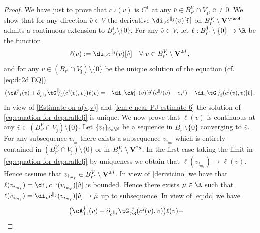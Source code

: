 \documentclass[11pt,a4paper,reqno]{article}
\numberwithin{equation}{section}
\theoremstyle{definition}
\begin{document}
\begin{proof}
We have  just to prove that 
$ c^{\parallel_{\hat \jmath}}(v) $ 
is $ C^1 $
at any  $ \bar v \in B_{r'}^V\cap V_{\hat \jmath}  $, $ \bar v \neq 0 $.
    We show that for any direction $\hat v\in V$ the derivative $\di_v c^{\parallel_{\hat \jmath}}(v)[\hat v]$ on $B_{r'}^V\setminus {\bf V}^{\twod}$ admits a continuous extension to $B_{r'}^{\hat \jmath}\setminus\{0\}$.
    For any $\hat v\in V$, let $\ell:B_{r'}^{\hat \jmath}\setminus\{0\}\to \R$ be the function
    $$
        \ell(v):=\di_v c^{\parallel_{\hat \jmath}}(v)[\hat v] \quad \forall  \ v\in B_{r'}^V\setminus {\bf V}^{2d} \, , 
    $$
    and for any $v\in (B_{r'}\cap V_{\hat \jmath})\setminus \{0\}$ be the unique solution of the equation (cf. \eqref{eq:dc2d EQ})
    \begin{equation}\label{eq:equation for dcparallelj}
            \big( \cA_{11}^{\hat \jmath}(v)+\partial_{c^{\parallel_{\hat \jmath}}}\tG^{\parallel_{\hat \jmath}}_{\geq 3}(c^{\hat \jmath}(v),v)\big)\ell(v)
            =
            -\di_v\cA^{\hat \jmath}_{11}(v)[\hat v](c^{\parallel_{\hat \jmath}}(v)-c_*^{\parallel_{\hat \jmath}})-\di_v\tG^{\parallel_{\hat \jmath}}_{\geq 3}(c^{\hat \jmath}(v),v)[\hat v] \, .
        \end{equation}
    In view of \eqref{Estimate on a(v,v)} and \eqref{lem:c near PJ estimate 6} the solution of \eqref{eq:equation for dcparallelj} is unique.
    We now prove that $\ell(v)$ is continuous 
     at any $\bar v\in (B_{r'}^V\cap V_{\hat \jmath})\setminus\{0\}$.
    Let $\{v_i\}_{i\in \N}$ be a sequence in $B_{r'}^{\hat \jmath}\setminus\{0\}$  converging to $\bar v$.
    For any subsequence $v_{i_m}$ there exists a subsequence $v_{i_{m_\ell}}$ which is entirely contained in $(B_{r'}^V\cap V_{\hat \jmath})\setminus\{0\}$ or in $B_{r'}^V\setminus{\bf V}^{2d}$.
    In the first case taking the limit in \eqref{eq:equation for dcparallelj} by uniqueness we obtain that $\ell(v_{i_{m_\ell}})\to \ell(\bar v)$.
    Hence assume that $v_{i_{m_\ell}}\in B_{r'}^V\setminus { \bf V}^{2d}$.
    In view of \eqref{derivicino} we have that $\ell(v_{i_{m_\ell}})=\di_v c^{\parallel_{\hat \jmath}}(v_{i_{m_\ell}})[\hat v]$ is bounded.
    Hence there exists $\bar \mu\in \R$ such that 
    $   \ell(v_{i_{m_\ell}})=\di_v c^{\parallel_{\hat \jmath}} (v_{i_{m_\ell}})[\hat v]\to \bar \mu $ up to subsequence. 
    In view of \eqref{eq:dc} we have
    \begin{equation}\label{eq:dc first component}
    \begin{aligned}
        &\big(\cA^{\hat \jmath}_{11}(v)+\partial_{c^{\parallel_{\hat \jmath}}}\tG^{\parallel_{\hat \jmath}}_{\geq 3}(c^{\hat \jmath}(v),v)\big)\ell(v)+

\end{aligned}
\end{equation}
\end{proof}
\end{document}
